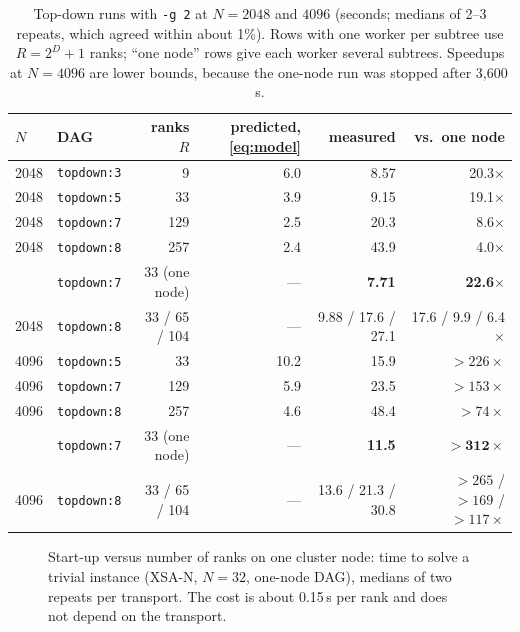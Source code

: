 \documentclass[11pt,a4paper]{article}
\newcommand{\XSA}{\textsf{XSA-N}}
\newcommand{\dfam}[1]{\texttt{#1}}
\newcommand{\opt}[1]{\texttt{#1}}
\begin{document}
\begin{table}[htbp]
\centering\small
\begin{tabular}{@{}llrrrr@{}}
\toprule
$N$ & DAG & ranks $R$ & predicted, \eqref{eq:model} & measured & vs.\ one node \\
\midrule
2048 & \dfam{topdown:3} & 9   & 6.0 & 8.57 & 20.3$\times$ \\
2048 & \dfam{topdown:5} & 33  & 3.9 & 9.15 & 19.1$\times$ \\
2048 & \dfam{topdown:7} & 129 & 2.5 & 20.3 & 8.6$\times$ \\
2048 & \dfam{topdown:8} & 257 & 2.4 & 43.9 & 4.0$\times$ \\
\addlinespace
2048 & \dfam{topdown:7} & 33 (one node) & --- & \textbf{7.71} & \textbf{22.6$\times$} \\
2048 & \dfam{topdown:8} & 33 / 65 / 104 & --- & 9.88 / 17.6 / 27.1 & 17.6 / 9.9 / 6.4$\times$ \\
\midrule
4096 & \dfam{topdown:5} & 33  & 10.2 & 15.9 & $>226\times$ \\
4096 & \dfam{topdown:7} & 129 & 5.9 & 23.5 & $>153\times$ \\
4096 & \dfam{topdown:8} & 257 & 4.6 & 48.4 & $>74\times$ \\
\addlinespace
4096 & \dfam{topdown:7} & 33 (one node) & --- & \textbf{11.5} & $\mathbf{>312\times}$ \\
4096 & \dfam{topdown:8} & 33 / 65 / 104 & --- & 13.6 / 21.3 / 30.8 & $>265$ / $>169$ / $>117\times$ \\
\bottomrule
\end{tabular}
\caption{Top-down runs with \opt{-g 2} at $N=2048$ and $4096$ (seconds; medians of 2--3
repeats, which agreed within about 1\%). Rows with one worker per subtree use
$R=2^D+1$ ranks; ``one node'' rows give each worker several subtrees. Speedups at
$N=4096$ are lower bounds, because the one-node run was stopped after 3{,}600\,s.}
\label{tab:wide}
\end{table}

\begin{figure}[htbp]
\centering
{}
\caption{Start-up versus number of ranks on one cluster node: time to solve a trivial instance
(\XSA{}, $N=32$, one-node DAG), medians of two repeats per transport. The cost is about
0.15\,s per rank and does not depend on the transport.}
\label{fig:startup}
\end{figure}
\end{document}
